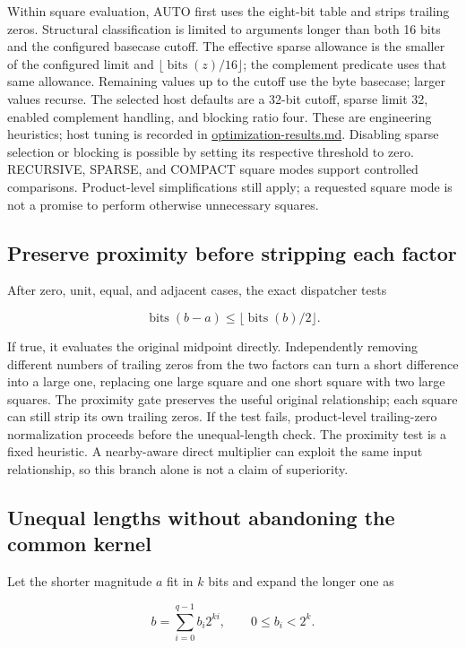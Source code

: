 \documentclass[11pt,a4paper]{article}
\begin{document}
Within square evaluation, AUTO first uses the eight-bit table and strips trailing zeros. Structural classification is limited to arguments longer than both 16 bits and the configured basecase cutoff. The effective sparse allowance is the smaller of the configured limit and $\lfloor\operatorname{bits}(z)/16\rfloor$; the complement predicate uses that same allowance. Remaining values up to the cutoff use the byte basecase; larger values recurse. The selected host defaults are a 32-bit cutoff, sparse limit 32, enabled complement handling, and blocking ratio four. These are engineering heuristics; host tuning is recorded in \href{\detokenize{optimization-results.md}}{optimization-results.md}. Disabling sparse selection or blocking is possible by setting its respective threshold to zero. RECURSIVE, SPARSE, and COMPACT square modes support controlled comparisons. Product-level simplifications still apply; a requested square mode is not a promise to perform otherwise unnecessary squares.

\subsection{Preserve proximity before stripping each factor}

After zero, unit, equal, and adjacent cases, the exact dispatcher tests

\[
\operatorname{bits}(b-a)\le\lfloor\operatorname{bits}(b)/2\rfloor.
\]

If true, it evaluates the original midpoint directly. Independently removing different numbers of trailing zeros from the two factors can turn a short difference into a large one, replacing one large square and one short square with two large squares. The proximity gate preserves the useful original relationship; each square can still strip its own trailing zeros. If the test fails, product-level trailing-zero normalization proceeds before the unequal-length check. The proximity test is a fixed heuristic. A nearby-aware direct multiplier can exploit the same input relationship, so this branch alone is not a claim of superiority.

\subsection{Unequal lengths without abandoning the common kernel}

Let the shorter magnitude $a$ fit in $k$ bits and expand the longer one as

\[
b=\sum_{i=0}^{q-1}b_i2^{ki},\qquad 0\le b_i<2^k.
\]
\end{document}
